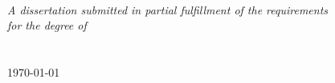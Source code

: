 \documentclass[
11pt, %
oneside, %
english, %
doublespacing, %
parskip, %
headsepline, %
]{MastersDoctoralThesis} %
\author{Onyekachi O. \textsc{Odoemene}} %
\begin{document}
\frontmatter %

\pagestyle{plain} %


\begin{titlepage}
\begin{center}


{\huge \bfseries \ttitle}\\[3cm] %
 
 \bigskip
 \bigskip
 \begin{center}
 	\bigskip
	{\LARGE \authorname \par} %
	\bigskip
    \bigskip
    \bigskip
 \end{center}
 

\large \textit{A dissertation submitted in partial fulfillment of the requirements\\ for the degree of \degreename}\\[3cm] %
\deptname\\\univname\\[2cm] %
 
{\large \today}\\[4cm] %

\vfill
\end{center}
\end{titlepage}
\end{document}
